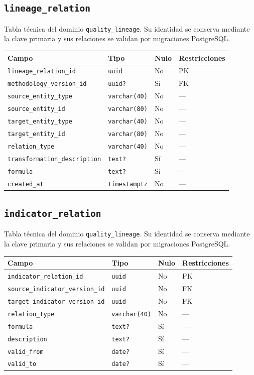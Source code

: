 \documentclass[11pt]{article}
\begin{document}
\subsection{\texttt{lineage\_relation}}
Tabla técnica del dominio \texttt{quality\_lineage}. Su identidad se conserva mediante la clave primaria y sus relaciones se validan por migraciones PostgreSQL.
\begin{longtable}{>{\raggedright\arraybackslash}p{} p{} p{} p{}}
\toprule Campo & Tipo & Nulo & Restricciones \\ \midrule\endhead
\texttt{lineage\_relation\_id} & \texttt{uuid} & No & PK \\
\texttt{methodology\_version\_id} & \texttt{uuid?} & Sí & FK \\
\texttt{source\_entity\_type} & \texttt{varchar(40)} & No & --- \\
\texttt{source\_entity\_id} & \texttt{varchar(80)} & No & --- \\
\texttt{target\_entity\_type} & \texttt{varchar(40)} & No & --- \\
\texttt{target\_entity\_id} & \texttt{varchar(80)} & No & --- \\
\texttt{relation\_type} & \texttt{varchar(40)} & No & --- \\
\texttt{transformation\_description} & \texttt{text?} & Sí & --- \\
\texttt{formula} & \texttt{text?} & Sí & --- \\
\texttt{created\_at} & \texttt{timestamptz} & No & --- \\
\bottomrule\end{longtable}
\subsection{\texttt{indicator\_relation}}
Tabla técnica del dominio \texttt{quality\_lineage}. Su identidad se conserva mediante la clave primaria y sus relaciones se validan por migraciones PostgreSQL.
\begin{longtable}{>{\raggedright\arraybackslash}p{} p{} p{} p{}}
\toprule Campo & Tipo & Nulo & Restricciones \\ \midrule\endhead
\texttt{indicator\_relation\_id} & \texttt{uuid} & No & PK \\
\texttt{source\_indicator\_version\_id} & \texttt{uuid} & No & FK \\
\texttt{target\_indicator\_version\_id} & \texttt{uuid} & No & FK \\
\texttt{relation\_type} & \texttt{varchar(40)} & No & --- \\
\texttt{formula} & \texttt{text?} & Sí & --- \\
\texttt{description} & \texttt{text?} & Sí & --- \\
\texttt{valid\_from} & \texttt{date?} & Sí & --- \\
\texttt{valid\_to} & \texttt{date?} & Sí & --- \\
\bottomrule\end{longtable}
\end{document}
